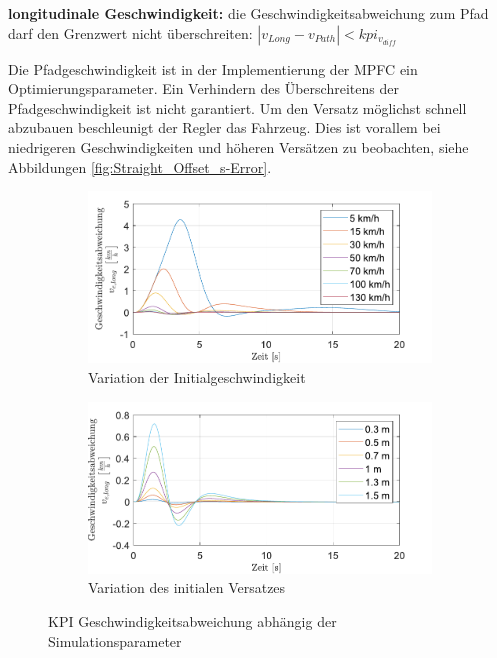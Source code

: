 \medskip\noindent\textbf{longitudinale Geschwindigkeit:} die Geschwindigkeitsabweichung zum Pfad darf den Grenzwert nicht überschreiten: $|v_{Long} - v_{Path}| < kpi_{v_{diff}}$

\noindent Die Pfadgeschwindigkeit ist in der Implementierung der MPFC ein Optimierungsparameter. Ein Verhindern des Überschreitens der Pfadgeschwindigkeit ist nicht garantiert. Um den Versatz möglichst schnell abzubauen beschleunigt der Regler das Fahrzeug. Dies ist vorallem bei niedrigeren Geschwindigkeiten und höheren Versätzen zu beobachten, siehe Abbildungen \ref{fig:Straight_Offset_s-Error}.   
\begin{figure}[ht]
    \centering
    \begin{subfigure}[b]{.49\textwidth}
        \centering
        \includegraphics[width=\textwidth]{figures/3_Implementierung/Straight_Offset/varVelo_1mOffset_v-Diff.pdf}
        \caption{Variation der Initialgeschwindigkeit}
        \label{fig:varVelo_1mOffset_v-Diff}
    \end{subfigure}
    \hfill
    \begin{subfigure}[b]{.49\textwidth}
        \centering
        \includegraphics[width=\textwidth]{figures/3_Implementierung/Straight_Offset/varOffset_50kmh_v-Diff.pdf}
        \caption{Variation des initialen Versatzes}
        \label{fig:varOffset_50kmh_v-Diff}
    \end{subfigure}
    \caption{KPI Geschwindigkeitsabweichung abhängig der Simulationsparameter}
    \label{fig:Straight_Offset_v-Diff}
\end{figure}

